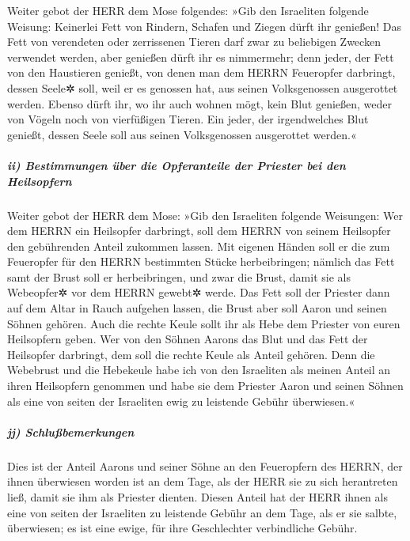 Weiter gebot der HERR dem Mose folgendes:
»Gib den Israeliten folgende Weisung: Keinerlei Fett von
Rindern, Schafen und Ziegen dürft ihr genießen! Das Fett
von verendeten oder zerrissenen Tieren darf zwar zu beliebigen Zwecken
verwendet werden, aber genießen dürft ihr es nimmermehr;
denn jeder, der Fett von den Haustieren genießt, von
denen man dem HERRN Feueropfer darbringt, dessen Seele✲ soll, weil er es
genossen hat, aus seinen Volksgenossen ausgerottet werden.
Ebenso dürft ihr, wo ihr auch wohnen mögt, kein Blut
genießen, weder von Vögeln noch von vierfüßigen Tieren.
Ein jeder, der irgendwelches Blut genießt, dessen Seele
soll aus seinen Volksgenossen ausgerottet werden.«

\hypertarget{ii-bestimmungen-uxfcber-die-opferanteile-der-priester-bei-den-heilsopfern}{%
\subparagraph{ii) Bestimmungen über die Opferanteile der Priester bei
den
Heilsopfern}\label{ii-bestimmungen-uxfcber-die-opferanteile-der-priester-bei-den-heilsopfern}}

Weiter gebot der HERR dem Mose: »Gib den
Israeliten folgende Weisungen: Wer dem HERRN ein Heilsopfer darbringt,
soll dem HERRN von seinem Heilsopfer den gebührenden Anteil zukommen
lassen. Mit eigenen Händen soll er die zum Feueropfer für
den HERRN bestimmten Stücke herbeibringen; nämlich das Fett samt der
Brust soll er herbeibringen, und zwar die Brust, damit sie als
Webeopfer✲ vor dem HERRN gewebt✲ werde. Das Fett soll der
Priester dann auf dem Altar in Rauch aufgehen lassen, die Brust aber
soll Aaron und seinen Söhnen gehören. Auch die rechte
Keule sollt ihr als Hebe dem Priester von euren Heilsopfern geben.
Wer von den Söhnen Aarons das Blut und das Fett der
Heilsopfer darbringt, dem soll die rechte Keule als Anteil gehören.
Denn die Webebrust und die Hebekeule habe ich von den
Israeliten als meinen Anteil an ihren Heilsopfern genommen und habe sie
dem Priester Aaron und seinen Söhnen als eine von seiten der Israeliten
ewig zu leistende Gebühr überwiesen.«

\hypertarget{jj-schluuxdfbemerkungen}{%
\subparagraph{jj) Schlußbemerkungen}\label{jj-schluuxdfbemerkungen}}

Dies ist der Anteil Aarons und seiner Söhne an den
Feueropfern des HERRN, der ihnen überwiesen worden ist an dem Tage, als
der HERR sie zu sich herantreten ließ, damit sie ihm als Priester
dienten. Diesen Anteil hat der HERR ihnen als eine von
seiten der Israeliten zu leistende Gebühr an dem Tage, als er sie
salbte, überwiesen; es ist eine ewige, für ihre Geschlechter
verbindliche Gebühr.

